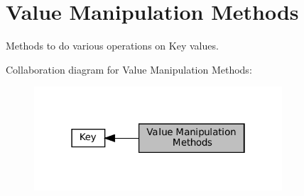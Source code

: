 \hypertarget{group__keyvalue}{}\section{Value Manipulation Methods}
\label{group__keyvalue}


Methods to do various operations on Key values.  


Collaboration diagram for Value Manipulation Methods\+:
\nopagebreak
\begin{figure}[H]
\begin{center}
\leavevmode
\includegraphics[width=262pt]{group__keyvalue}
\end{center}
\end{figure}
